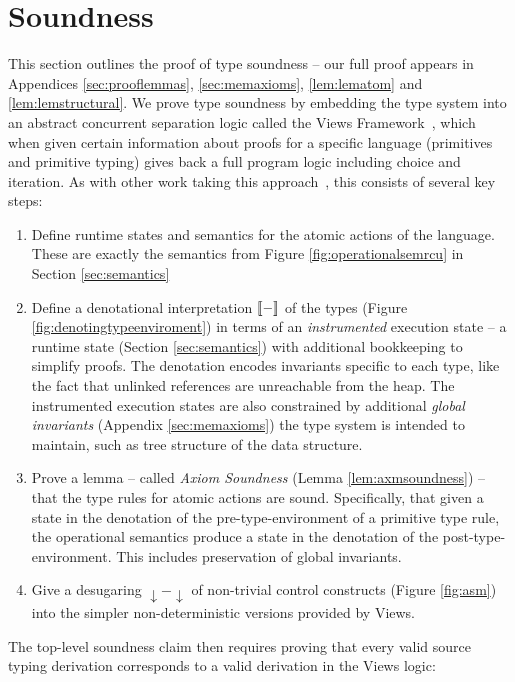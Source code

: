 \section{Soundness}
\label{sec:soundness}
This section outlines the proof of type soundness -- our full proof appears in Appendices \ref{sec:prooflemmas}, \ref{sec:memaxioms}, \ref{lem:lematom} and \ref{lem:lemstructural}.
We prove type soundness by embedding the type system into an abstract concurrent separation logic called the Views Framework~\cite{views}, which when given certain information about proofs for a specific language (primitives and primitive typing) gives back a full program logic including choice and iteration.  As with other work taking this approach~\cite{oopsla12,toplas17}, this consists of several key steps:
\begin{enumerate}
    \item Define runtime states and semantics for the atomic actions of the language.  These are exactly the semantics from Figure \ref{fig:operationalsemrcu} in Section \ref{sec:semantics}
    \item Define a denotational interpretation $\llbracket-\rrbracket$ of the types (Figure \ref{fig:denotingtypeenviroment}) in terms of an \emph{instrumented} execution state -- a runtime state (Section \ref{sec:semantics}) with additional bookkeeping to simplify proofs.  
    The denotation encodes invariants specific to each type, like the fact that \textsf{unlinked} references are unreachable from the heap. %
    The instrumented execution states are also constrained by additional \textit{global invariants} (Appendix \ref{sec:memaxioms}) the type system is intended to maintain, such as tree structure of the data structure.
    \item Prove a lemma -- called \emph{Axiom Soundness} (Lemma \ref{lem:axmsoundness}) -- that the type rules for atomic actions are sound.  Specifically, that given a state in the denotation of the pre-type-environment of a primitive type rule, the operational semantics produce a state in the denotation of the post-type-environment.  This includes preservation of global invariants.
    \item Give a desugaring $\downarrow-\downarrow$ of non-trivial control constructs (Figure \ref{fig:asm}) into the simpler non-deterministic versions provided by Views.
\end{enumerate}
The top-level soundness claim then requires proving that every valid source typing derivation corresponds to a valid derivation in the Views logic:
